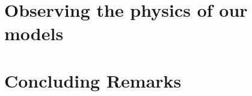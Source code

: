 \documentclass[12pt,a4paper]{report}
\begin{document}
\chapter{Observing the physics of our models}
\label{chap:7}



\chapter{Concluding Remarks}


\clearpage





\end{document}
